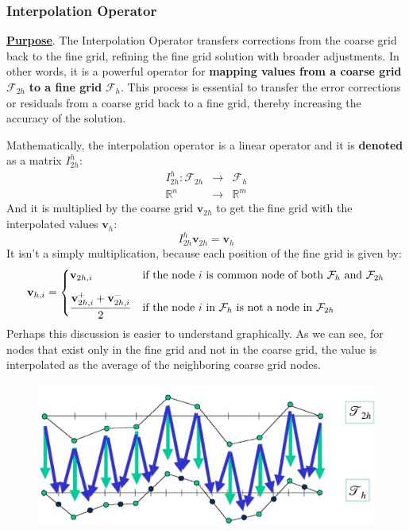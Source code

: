 \subsubsection{Interpolation Operator}\label{subsubsection: Interpolation Operator}

\textbf{\underline{Purpose}}. The Interpolation Operator transfers corrections from the coarse grid back to the fine grid, refining the fine grid solution with broader adjustments. In other words, it is a powerful operator for \textbf{mapping values from a coarse grid} $\mathcal{F}_{2h}$ \textbf{to a fine grid} $\mathcal{F}_{h}$. This process is essential to transfer the error corrections or residuals from a coarse grid back to a fine grid, thereby increasing the accuracy of the solution.

\highspace
Mathematically, the interpolation operator is a linear operator and it is \textbf{denoted} as a matrix $I^{h}_{2h}$:
\begin{equation}
    \begin{array}{rcl}
        I^{h}_{2h}: \mathcal{F}_{2h} & \longrightarrow & \mathcal{F}_{h} \\ [.5em]
        \mathbb{R}^{n} & \longrightarrow & \mathbb{R}^{m}
    \end{array}
\end{equation}
And it is multiplied by the coarse grid $\mathbf{v}_{2h}$ to get the fine grid with the interpolated values $\mathbf{v}_{h}$:
\begin{equation}
    I^{h}_{2h} \mathbf{v}_{2h} = \mathbf{v}_{h}
\end{equation}
It isn't a simply multiplication, because each position of the fine grid is given by:
\begin{equation*}
    \mathbf{v}_{h,i} = \begin{cases}
        \mathbf{v}_{2h,i} & \text{if the node } i \text{ is common node of both } \mathcal{F}_{h} \text{ and } \mathcal{F}_{2h} \vspace{.8em}\\
        \dfrac{
            \mathbf{v}_{2h,i}^{+} + \mathbf{v}_{2h,i}^{-}
        }{2} & \text{if the node } i \text{ in } \mathcal{F}_{h} \text{ is not a node in } \mathcal{F}_{2h}
    \end{cases}
\end{equation*}
Perhaps this discussion is easier to understand graphically. As we can see, for nodes that exist only in the fine grid and not in the coarse grid, the value is interpolated as the average of the neighboring coarse grid nodes.
\begin{figure}[!htp]
    \centering
    \includegraphics[width=.8\textwidth]{img/interpolation-operator-1.pdf}
\end{figure}

